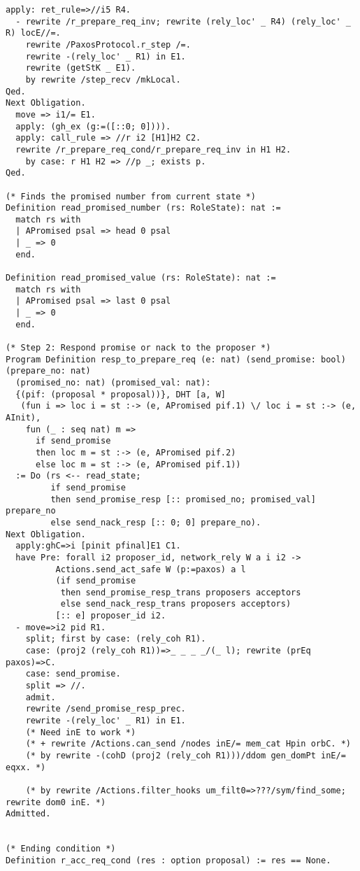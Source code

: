 \begin{landscape}
\begin{multicols*}{2}
\begin{lstlisting}[style=SourceCodeListing]
  apply: ret_rule=>//i5 R4.
  - rewrite /r_prepare_req_inv; rewrite (rely_loc' _ R4) (rely_loc' _ R) locE//=.
    rewrite /PaxosProtocol.r_step /=.
    rewrite -(rely_loc' _ R1) in E1.
    rewrite (getStK _ E1).
    by rewrite /step_recv /mkLocal.
Qed.
Next Obligation.
  move => i1/= E1.
  apply: (gh_ex (g:=([::0; 0]))).
  apply: call_rule => //r i2 [H1]H2 C2.
  rewrite /r_prepare_req_cond/r_prepare_req_inv in H1 H2.
    by case: r H1 H2 => //p _; exists p.
Qed.

(* Finds the promised number from current state *)
Definition read_promised_number (rs: RoleState): nat :=
  match rs with
  | APromised psal => head 0 psal
  | _ => 0
  end.

Definition read_promised_value (rs: RoleState): nat :=
  match rs with
  | APromised psal => last 0 psal
  | _ => 0
  end.

(* Step 2: Respond promise or nack to the proposer *)
Program Definition resp_to_prepare_req (e: nat) (send_promise: bool) (prepare_no: nat)
  (promised_no: nat) (promised_val: nat):
  {(pif: (proposal * proposal))}, DHT [a, W]
   (fun i => loc i = st :-> (e, APromised pif.1) \/ loc i = st :-> (e, AInit),
    fun (_ : seq nat) m =>
      if send_promise
      then loc m = st :-> (e, APromised pif.2)
      else loc m = st :-> (e, APromised pif.1))
  := Do (rs <-- read_state;
         if send_promise
         then send_promise_resp [:: promised_no; promised_val] prepare_no
         else send_nack_resp [:: 0; 0] prepare_no).
Next Obligation.
  apply:ghC=>i [pinit pfinal]E1 C1.
  have Pre: forall i2 proposer_id, network_rely W a i i2 ->
          Actions.send_act_safe W (p:=paxos) a l
          (if send_promise
           then send_promise_resp_trans proposers acceptors
           else send_nack_resp_trans proposers acceptors)
          [:: e] proposer_id i2.
  - move=>i2 pid R1.
    split; first by case: (rely_coh R1).
    case: (proj2 (rely_coh R1))=>_ _ _ _/(_ l); rewrite (prEq paxos)=>C.
    case: send_promise.
    split => //.
    admit.
    rewrite /send_promise_resp_prec.
    rewrite -(rely_loc' _ R1) in E1.
    (* Need inE to work *)
    (* + rewrite /Actions.can_send /nodes inE/= mem_cat Hpin orbC. *)
    (* by rewrite -(cohD (proj2 (rely_coh R1)))/ddom gen_domPt inE/= eqxx. *)

    (* by rewrite /Actions.filter_hooks um_filt0=>???/sym/find_some; rewrite dom0 inE. *)
Admitted.


(* Ending condition *)
Definition r_acc_req_cond (res : option proposal) := res == None.


\end{lstlisting}
\end{multicols*}
\end{landscape}
